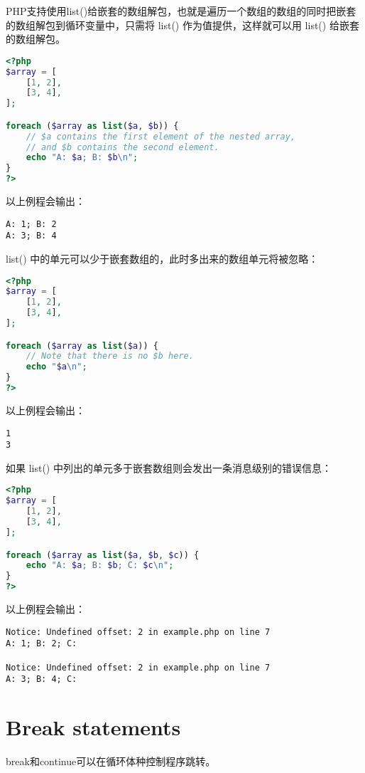 PHP支持使用list()给嵌套的数组解包，也就是遍历一个数组的数组的同时把嵌套的数组解包到循环变量中，只需将 list() 作为值提供，这样就可以用 list() 给嵌套的数组解包。

\begin{lstlisting}[language=PHP]
<?php
$array = [
    [1, 2],
    [3, 4],
];

foreach ($array as list($a, $b)) {
    // $a contains the first element of the nested array,
    // and $b contains the second element.
    echo "A: $a; B: $b\n";
}
?>
\end{lstlisting}

以上例程会输出：

\begin{verbatim}
A: 1; B: 2
A: 3; B: 4
\end{verbatim}

list() 中的单元可以少于嵌套数组的，此时多出来的数组单元将被忽略：

\begin{lstlisting}[language=PHP]
<?php
$array = [
    [1, 2],
    [3, 4],
];

foreach ($array as list($a)) {
    // Note that there is no $b here.
    echo "$a\n";
}
?>
\end{lstlisting}

以上例程会输出：

\begin{verbatim}
1
3
\end{verbatim}

如果 list() 中列出的单元多于嵌套数组则会发出一条消息级别的错误信息：


\begin{lstlisting}[language=PHP]
<?php
$array = [
    [1, 2],
    [3, 4],
];

foreach ($array as list($a, $b, $c)) {
    echo "A: $a; B: $b; C: $c\n";
}
?>
\end{lstlisting}

以上例程会输出：


\begin{verbatim}
Notice: Undefined offset: 2 in example.php on line 7
A: 1; B: 2; C: 

Notice: Undefined offset: 2 in example.php on line 7
A: 3; B: 4; C: 
\end{verbatim}

\section{Break statements}

break和continue可以在循环体种控制程序跳转。

